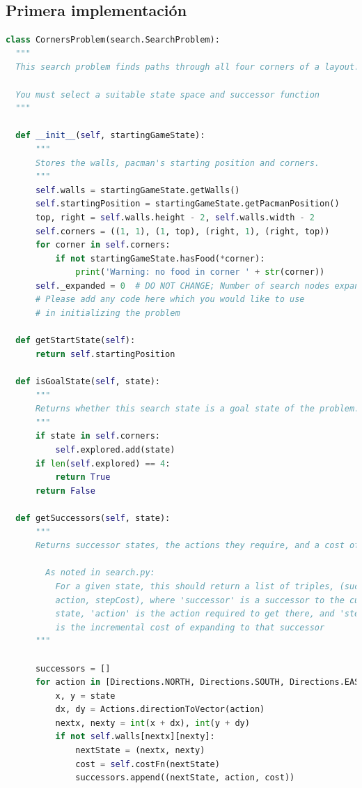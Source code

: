 \documentclass{report}
\begin{document}
        \subsection*{Primera implementación}
          \begin{lstlisting}[language=Python, caption=Implementación inicial del problema de las esquinas]
class CornersProblem(search.SearchProblem):
  """
  This search problem finds paths through all four corners of a layout.

  You must select a suitable state space and successor function
  """

  def __init__(self, startingGameState):
      """
      Stores the walls, pacman's starting position and corners.
      """
      self.walls = startingGameState.getWalls()
      self.startingPosition = startingGameState.getPacmanPosition()
      top, right = self.walls.height - 2, self.walls.width - 2
      self.corners = ((1, 1), (1, top), (right, 1), (right, top))
      for corner in self.corners:
          if not startingGameState.hasFood(*corner):
              print('Warning: no food in corner ' + str(corner))
      self._expanded = 0  # DO NOT CHANGE; Number of search nodes expanded
      # Please add any code here which you would like to use
      # in initializing the problem
              
  def getStartState(self):
      return self.startingPosition

  def isGoalState(self, state):
      """
      Returns whether this search state is a goal state of the problem.
      """
      if state in self.corners:
          self.explored.add(state)
      if len(self.explored) == 4:
          return True
      return False

  def getSuccessors(self, state):
      """
      Returns successor states, the actions they require, and a cost of 1.

        As noted in search.py:
          For a given state, this should return a list of triples, (successor,
          action, stepCost), where 'successor' is a successor to the current
          state, 'action' is the action required to get there, and 'stepCost'
          is the incremental cost of expanding to that successor
      """

      successors = []
      for action in [Directions.NORTH, Directions.SOUTH, Directions.EAST, Directions.WEST]:
          x, y = state
          dx, dy = Actions.directionToVector(action)
          nextx, nexty = int(x + dx), int(y + dy)
          if not self.walls[nextx][nexty]:
              nextState = (nextx, nexty)
              cost = self.costFn(nextState)
              successors.append((nextState, action, cost))


\end{lstlisting}
\end{document}
